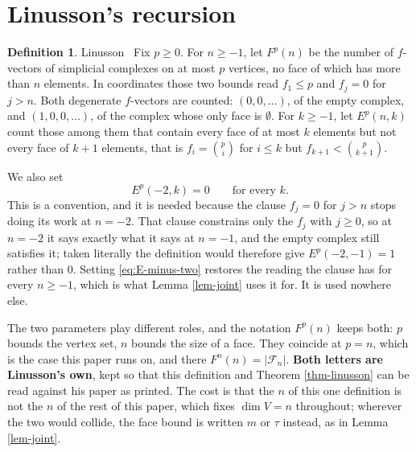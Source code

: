 \documentclass[11pt, a4paper, abstract=yes]{scrartcl}
\theoremstyle{definition}
\newtheorem{definition}{Definition}
\theoremstyle{remark}
\theoremstyle{plain}
\begin{document}
\section{Linusson's recursion}
\label{sec-linusson}
\begin{definition}
Linusson~\cite[\S3]{Linusson1999} Fix \(p\ge0\). For \(n\ge-1\), let \(F^p(n)\) be the number of
\(f\)-vectors of simplicial complexes on at most \(p\) vertices, no face of which has more than
\(n\) elements. In coordinates those two bounds read \(f_1\le p\) and \(f_j=0\) for \(j>n\). Both
degenerate \(f\)-vectors are counted: \((0,0,\dots)\), of the empty complex, and
\((1,0,0,\dots)\), of the complex whose only face is \(\emptyset\). For \(k\ge-1\), let
\(E^p(n,k)\) count those among them that contain every face of at most \(k\)
elements but not every face of \(k+1\) elements, that is \(f_i=\binom pi\) for \(i\le k\) but
\(f_{k+1}<\binom p{k+1}\).

We also set
\begin{equation}\label{eq:E-minus-two}
  E^p(-2,k)=0\qquad\text{for every }k .
\end{equation}
This is a convention, and it is needed because the clause \(f_j=0\) for \(j>n\) stops doing its
work at \(n=-2\). That clause constrains only the \(f_j\) with \(j\ge0\), so at \(n=-2\) it says
exactly what it says at \(n=-1\), and the empty complex still satisfies it; taken literally the
definition would therefore give \(E^p(-2,-1)=1\) rather than \(0\). Setting
\eqref{eq:E-minus-two} restores the reading the clause has for every \(n\ge-1\), which is what
Lemma \ref{lem-joint} uses it for. It is used nowhere else.
\label{def-linusson}
\end{definition}

The two parameters play different roles, and the notation \(F^p(n)\) keeps both: \(p\) bounds the
vertex set, \(n\) bounds the size of a face. They coincide at \(p=n\), which is the case this paper
runs on, and there \(F^n(n)=\lvert\mathcal F_n\rvert\). \textbf{Both letters are Linusson's own}, kept so
that this definition and Theorem \ref{thm-linusson} can be read against his paper as printed. The
cost is that the \(n\) of this one definition is not the \(n\) of the rest of this paper, which
fixes \(\dim V=n\) throughout; wherever the two would collide, the face bound is written \(m\) or
\(\tau\) instead, as in Lemma \ref{lem-joint}.
\end{document}
